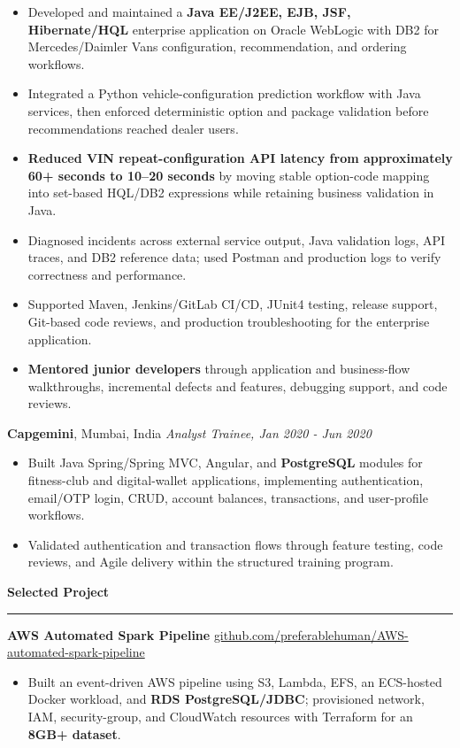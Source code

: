 \documentclass[11pt,letterpaper]{article}
\newcommand{\ressection}[1]{\Needspace{6\baselineskip}\vspace{8pt}\par\textbf{#1}\par\vspace{2pt}\hrule\vspace{5pt}}
\begin{document}
\begin{itemize}
  \item Developed and maintained a \textbf{Java EE/J2EE, EJB, JSF, Hibernate/HQL} enterprise application on Oracle WebLogic with DB2 for Mercedes/Daimler Vans configuration, recommendation, and ordering workflows.
  \item Integrated a Python vehicle-configuration prediction workflow with Java services, then enforced deterministic option and package validation before recommendations reached dealer users.
  \item \textbf{Reduced VIN repeat-configuration API latency from approximately 60+ seconds to 10--20 seconds} by moving stable option-code mapping into set-based HQL/DB2 expressions while retaining business validation in Java.
  \item Diagnosed incidents across external service output, Java validation logs, API traces, and DB2 reference data; used Postman and production logs to verify correctness and performance.
  \item Supported Maven, Jenkins/GitLab CI/CD, JUnit4 testing, release support, Git-based code reviews, and production troubleshooting for the enterprise application.
  \item \textbf{Mentored junior developers} through application and business-flow walkthroughs, incremental defects and features, debugging support, and code reviews.
\end{itemize}
\textbf{Capgemini}, Mumbai, India \hfill \textit{Analyst Trainee, Jan 2020 - Jun 2020}
\begin{itemize}
  \item Built Java Spring/Spring MVC, Angular, and \textbf{PostgreSQL} modules for fitness-club and digital-wallet applications, implementing authentication, email/OTP login, CRUD, account balances, transactions, and user-profile workflows.
  \item Validated authentication and transaction flows through feature testing, code reviews, and Agile delivery within the structured training program.
\end{itemize}

\ressection{Selected Project}
\textbf{AWS Automated Spark Pipeline} \hfill \href{https://github.com/preferablehuman/AWS-automated-spark-pipeline}{github.com/preferablehuman/AWS-automated-spark-pipeline}
\begin{itemize}
  \item Built an event-driven AWS pipeline using S3, Lambda, EFS, an ECS-hosted Docker workload, and \textbf{RDS PostgreSQL/JDBC}; provisioned network, IAM, security-group, and CloudWatch resources with Terraform for an \textbf{8GB+ dataset}.
\end{itemize}
\end{document}
